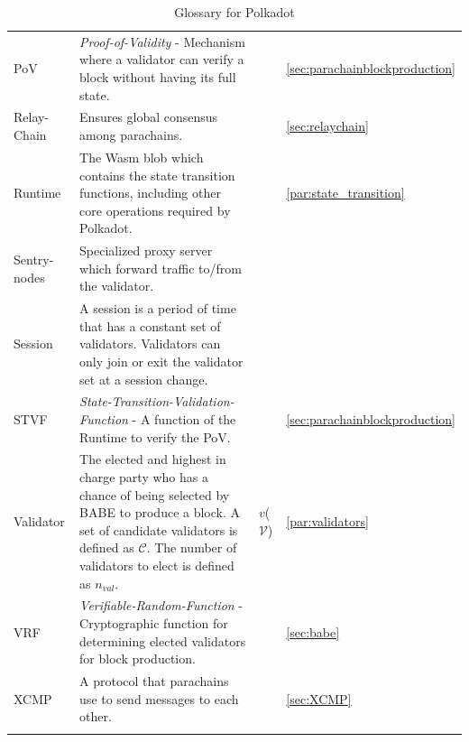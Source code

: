 \documentclass{article}
\newcommand{\Val}{\ensuremath{\mathcal{V}}} %
\newcommand{\nval}{\ensuremath{n_{val}}} %
\newcommand{\Can}{\ensuremath{\mathcal{C}}} %
\newcommand{\val}{\ensuremath{v}} %
\begin{document}
\begin{appendix}
\begin{longtable}{p{}p{}p{}p{}}
	PoV & \emph{Proof-of-Validity} - Mechanism where a validator can verify a block without having its full state. && \ref{sec:parachainblockproduction} \\
	Relay\newline- Chain & Ensures global consensus among parachains. && \ref{sec:relaychain} \\
	Runtime & The Wasm blob which contains the state transition functions, including other core operations required by Polkadot. && \ref{par:state_transition} \\
	Sentry\newline- nodes & Specialized proxy server which forward traffic to/from the validator. && \\
	Session & A session is a period of time that has a constant set of validators. Validators can only join or exit the validator set at a session change. && \\
	STVF & \emph{State-Transition-Validation-Function} - A function of the Runtime to verify the PoV. && \ref{sec:parachainblockproduction} \\
	Validator & The elected and highest in charge party who has a chance of being selected by BABE to produce a block. A set of candidate validators is defined as \Can . The number of validators to elect is defined as \nval . & \val (\Val)& \ref{par:validators} \\
	VRF & \emph{Verifiable-Random-Function} - Cryptographic function for determining elected validators for block production. && \ref{sec:babe} \\
	XCMP & A protocol that parachains use to send messages to each other. && \ref{sec:XCMP} \\
	\caption{Glossary for Polkadot}
\end{longtable}


\end{appendix}
\end{document}
